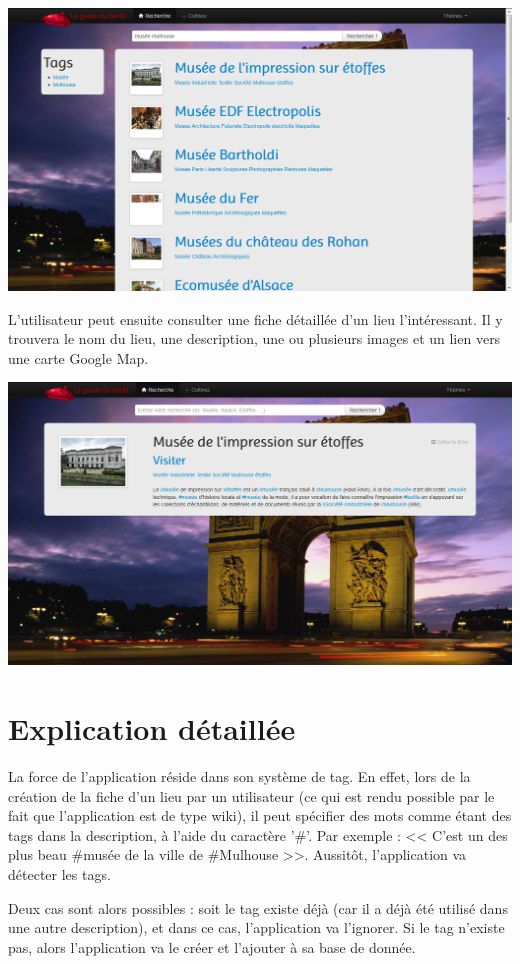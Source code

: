 \documentclass[12pt, a4paper]{article}
\newcommand{\espace}{\vspace{.8cm}}
\begin{document}
\espace{}
\includegraphics[width=.9\textwidth, keepaspectratio=true]{img/abase2.png}

\espace{}
L'utilisateur peut ensuite consulter une fiche détaillée d'un lieu l'intéressant. Il y trouvera le nom du lieu, une description, une ou plusieurs images et un lien vers une carte Google Map.

\espace{}
\includegraphics[width=.9\textwidth, keepaspectratio=true]{img/abase3.png}

\espace{}
\section{Explication détaillée}
La force de l'application réside dans son système de tag. En effet, lors de la création de la fiche d'un lieu par un utilisateur (ce qui est rendu possible par le fait que l'application est de type wiki), il peut spécifier des mots comme étant des tags dans la description, à l'aide du caractère '\#'. Par exemple : << C'est un des plus beau \#musée de la ville de \#Mulhouse >>. Aussitôt, l'application va détecter les tags.

Deux cas sont alors possibles : soit le tag existe déjà (car il a déjà été utilisé dans une autre description), et dans ce cas, l'application va l'ignorer. Si le tag n'existe pas, alors l'application va le créer et l'ajouter à sa base de donnée.
\end{document}
